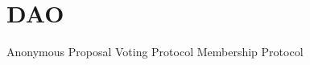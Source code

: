 \documentclass[a4paper,10pt]{article}
\begin{document}
\section{DAO}
Anonymous Proposal Voting Protocol
Membership Protocol
\end{document}
